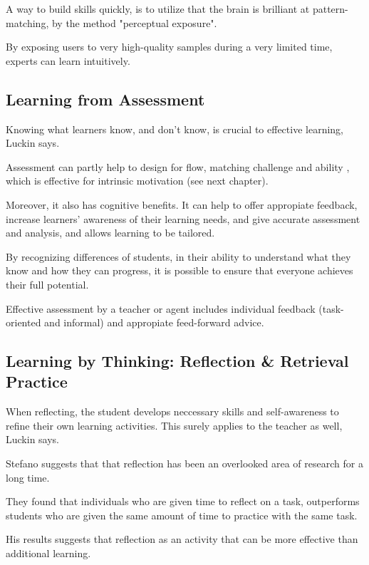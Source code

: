   A way to build skills quickly, is to utilize that the brain is brilliant at pattern-matching, by the method "perceptual exposure". \cite{sierra}

  By exposing users to very high-quality samples during a very limited time, experts can learn intuitively.

  \subsection{Learning from Assessment}

  Knowing what learners know, and don't know, is crucial to effective learning, Luckin \cite{luckin} says.

  Assessment can partly help to design for flow, matching challenge and ability \cite{bruhlmann}, which is effective for intrinsic motivation (see next chapter).

  Moreover, it also has cognitive benefits. It can help to offer appropiate feedback, increase learners' awareness of their learning needs, and give accurate assessment and analysis, and allows learning to be tailored.

  By recognizing differences of students, in their ability to understand what they know and how they can progress, it is possible to ensure that everyone achieves their full potential.

  Effective assessment by a teacher or agent includes individual feedback (task-oriented and informal) and appropiate feed-forward advice.

  \subsection{Learning by Thinking: Reflection \& Retrieval Practice}

  When reflecting, the student develops neccessary skills and self-awareness to refine their own learning activities. This surely applies to the teacher as well, Luckin says. \cite{luckin}

  Stefano \cite{stefano} suggests that that reflection has been an overlooked area of research for a long time.

  They found that individuals who are given time to reflect on a task, outperforms students who are given the same amount of time to practice with the same task.

  His results suggests that reflection as an activity that can be more effective than additional learning.

